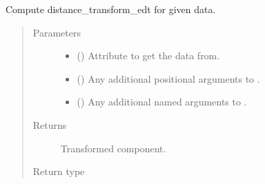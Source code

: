 \documentclass[letterpaper,10pt,english]{sphinxmanual}
\begin{document}
\begin{fulllineitems}
\begin{fulllineitems}
\label{\detokenize{api/base_classes:geology.src.base_spatial.SpatialComponent.distance_transform_edt}}
Compute distance\_transform\_edt for given data.
\begin{quote}\begin{description}
\item[{Parameters}] \leavevmode\begin{itemize}
\item {} 
 (\sphinxstyleliteralemphasis{\sphinxupquote{, }}) \textendash{} Attribute to get the data from.

\item {} 
 () \textendash{} Any additional positional arguments to .

\item {} 
 () \textendash{} Any additional named arguments to .

\end{itemize}

\item[{Returns}] \leavevmode
{} \textendash{} Transformed component.

\item[{Return type}] \leavevmode
{\hyperref[\detokenize{api/base_classes:geology.src.base_spatial.SpatialComponent}]{}}

\end{description}\end{quote}

\end{fulllineitems}



\end{fulllineitems}
\end{document}
